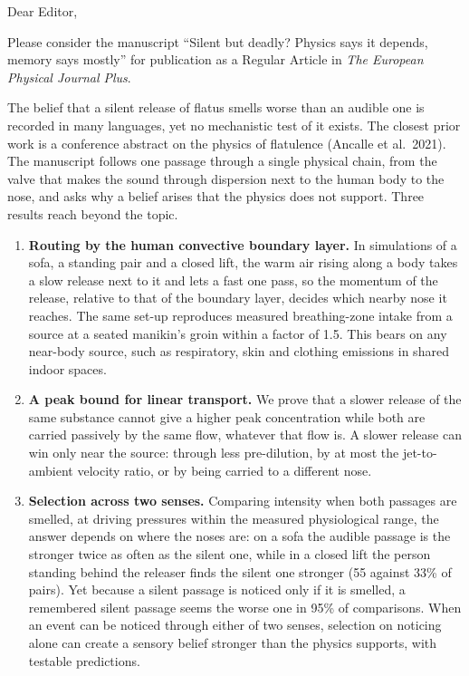 \documentclass[11pt]{article}
\begin{document}
Dear Editor,

Please consider the manuscript ``Silent but deadly? Physics says it depends, memory says mostly'' for publication as a
Regular Article in \emph{The European Physical Journal Plus}.

The belief that a silent release of flatus smells worse than an audible one is recorded in many languages, yet no
mechanistic test of it exists. The closest prior work is a conference abstract on the physics of flatulence (Ancalle
et al.\ 2021). The manuscript follows one passage through a single physical chain, from the valve that makes the
sound through dispersion next to the human body to the nose, and asks why a belief arises that the physics does not
support. Three results reach beyond the topic.

\begin{enumerate}
  \item \textbf{Routing by the human convective boundary layer.} In simulations of a sofa, a standing pair and a
  closed lift, the warm air rising along a body takes a slow release next to it and lets a fast one pass, so the
  momentum of the release, relative to that of the boundary layer, decides which nearby nose it reaches. The same
  set-up reproduces measured breathing-zone intake from a source at a seated manikin's groin within a factor of 1.5.
  This bears on any near-body source, such as respiratory, skin and clothing emissions in shared indoor spaces.
  \item \textbf{A peak bound for linear transport.} We prove that a slower release of the same substance cannot give a
  higher peak concentration while both are carried passively by the same flow, whatever that flow is. A slower release
  can win only near the source: through less pre-dilution, by at most the jet-to-ambient velocity ratio, or by being
  carried to a different nose.
  \item \textbf{Selection across two senses.} Comparing intensity when both passages are smelled, at driving
  pressures within the measured physiological range, the answer depends on where the noses are: on a sofa the audible
  passage is the stronger twice as often as the silent one, while in a closed lift the person standing behind the
  releaser finds the silent one stronger (55 against 33\% of pairs). Yet because a silent passage is noticed only if
  it is smelled, a remembered silent passage seems the worse one in 95\% of comparisons. When an event can be noticed
  through either of two senses, selection on noticing alone can create a sensory belief stronger than the physics
  supports, with testable predictions.
\end{enumerate}
\end{document}
